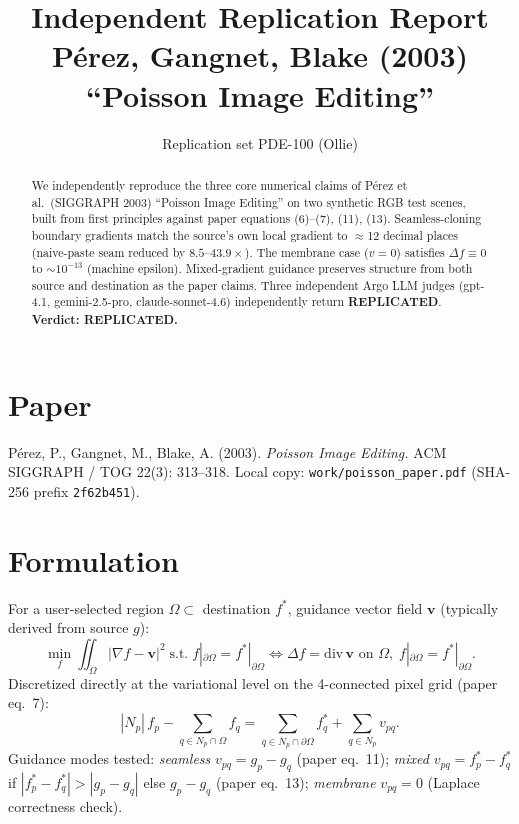 \documentclass[11pt]{article}
\title{Independent Replication Report\\
       P\'erez, Gangnet, Blake (2003) ``Poisson Image Editing''}
\author{Replication set PDE-100 (Ollie)}
\date{}
\begin{document}
\maketitle

\begin{abstract}
We independently reproduce the three core numerical claims of P\'erez et al.\
(SIGGRAPH 2003) ``Poisson Image Editing'' on two synthetic RGB test scenes,
built from first principles against paper equations (6)--(7), (11), (13).
Seamless-cloning boundary gradients match the source's own local gradient to
$\approx$12 decimal places (naive-paste seam reduced by \(8.5\text{--}43.9\times\)).
The membrane case (\(v=0\)) satisfies \(\Delta f\equiv 0\) to
$\sim 10^{-13}$ (machine epsilon). Mixed-gradient guidance preserves
structure from both source and destination as the paper claims. Three
independent Argo LLM judges (gpt-4.1, gemini-2.5-pro, claude-sonnet-4.6)
independently return \textbf{REPLICATED}. \textbf{Verdict: REPLICATED.}
\end{abstract}

\section{Paper}
P\'erez, P., Gangnet, M., Blake, A. (2003). \textit{Poisson Image Editing.}
ACM SIGGRAPH / TOG 22(3): 313--318. Local copy:
\texttt{work/poisson\_paper.pdf} (SHA-256 prefix \texttt{2f62b451}).

\section{Formulation}
For a user-selected region \(\Omega\subset\) destination \(f^*\), guidance
vector field \(\mathbf v\) (typically derived from source \(g\)):
\begin{equation}
  \min_{f}\iint_\Omega |\nabla f - \mathbf v|^2 \;\text{s.t.}\;
  f|_{\partial\Omega}=f^*|_{\partial\Omega}
  \iff \Delta f = \mathrm{div}\,\mathbf v \text{ on }\Omega,\;
  f|_{\partial\Omega}=f^*|_{\partial\Omega}.
\end{equation}
Discretized directly at the variational level on the 4-connected pixel grid
(paper eq.\ 7):
\begin{equation}
  |N_p|\, f_p - \sum_{q\in N_p\cap\Omega} f_q
  = \sum_{q\in N_p\cap\partial\Omega} f^*_q + \sum_{q\in N_p} v_{pq}.
\end{equation}
Guidance modes tested:
\emph{seamless} \(v_{pq}=g_p-g_q\) (paper eq.\ 11);
\emph{mixed} \(v_{pq}=f^*_p-f^*_q\) if \(|f^*_p-f^*_q|>|g_p-g_q|\) else
\(g_p-g_q\) (paper eq.\ 13);
\emph{membrane} \(v_{pq}=0\) (Laplace correctness check).
\end{document}
